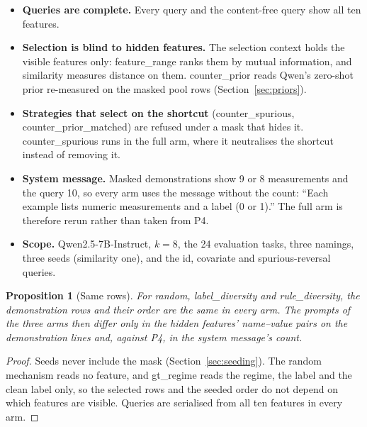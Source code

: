 \documentclass[11pt,a4paper]{article}
\newcommand{\1}{\mathbf{1}}
\theoremstyle{plain}
\newtheorem{proposition}[theorem]{Proposition}
\theoremstyle{definition}
\theoremstyle{remark}
\begin{document}
\begin{itemize}[nosep]
  \item \textbf{Queries are complete.} Every query and the content-free query
        show all ten features.
  \item \textbf{Selection is blind to hidden features.} The selection context
        holds the visible features only: feature\_range ranks them by mutual
        information, and similarity measures distance on them. counter\_prior
        reads Qwen's zero-shot prior re-measured on the masked pool rows
        (Section~\ref{sec:priors}).
  \item \textbf{Strategies that select on the shortcut} (counter\_spurious,
        counter\_prior\_matched) are refused under a mask that hides it.
        counter\_spurious runs in the full arm, where it neutralises the shortcut
        instead of removing it.
  \item \textbf{System message.} Masked demonstrations show 9 or 8 measurements
        and the query 10, so every arm uses the message without the count:
        ``Each example lists numeric measurements and a label (0 or 1).''
        The full arm is therefore rerun rather than taken from P4.
  \item \textbf{Scope.} Qwen2.5-7B-Instruct, $k = 8$, the 24 evaluation
        tasks, three namings, three seeds (similarity one), and the id,
        covariate and spurious-reversal queries.
\end{itemize}

\begin{proposition}[Same rows]
\label{prop:demo-mask-rows}
For random, label\_diversity and rule\_diversity, the demonstration rows and
their order are the same in every arm. The prompts of the three arms then
differ only in the hidden features' name--value pairs on the demonstration
lines and, against P4, in the system message's count.
\end{proposition}
\begin{proof}
Seeds never include the mask (Section~\ref{sec:seeding}). The random
mechanism reads no feature, and gt\_regime reads the regime, the label and
the clean label only, so the selected rows and the seeded order do not
depend on which features are visible. Queries are serialised from all ten
features in every arm.
\end{proof}
\end{document}
